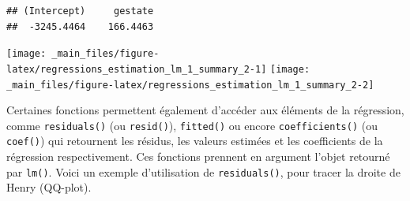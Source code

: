 \documentclass[
  11pt,
]{book}
\newenvironment{Shaded}{\begin{snugshade}}{\end{snugshade}}
\newcommand{\CommentTok}[1]{\textcolor[rgb]{0.56,0.35,0.01}{\textit{#1}}}
\newcommand{\KeywordTok}[1]{\textcolor[rgb]{0.13,0.29,0.53}{\textbf{#1}}}
\newcommand{\NormalTok}[1]{#1}
\newcommand{\OperatorTok}[1]{\textcolor[rgb]{0.81,0.36,0.00}{\textbf{#1}}}
\newcommand{\StringTok}[1]{\textcolor[rgb]{0.31,0.60,0.02}{#1}}
\numberwithin{equation}{section}
\numberwithin{countremarque}{section}
\begin{document}
\begin{lstlisting}
## (Intercept)     gestate 
##  -3245.4464    166.4463
\end{lstlisting}

\begin{Shaded}
\end{Shaded}

\begin{center}\texttt{[image: \_main\_files/figure-latex/regressions\_estimation\_lm\_1\_summary\_2-1]} \texttt{[image: \_main\_files/figure-latex/regressions\_estimation\_lm\_1\_summary\_2-2]} \end{center}

Certaines fonctions permettent également d'accéder aux éléments de la régression, comme \texttt{residuals()} (ou \texttt{resid()}), \texttt{fitted()} ou encore \texttt{coefficients()} (ou \texttt{coef()}) qui retournent les résidus, les valeurs estimées et les coefficients de la régression respectivement. Ces fonctions prennent en argument l'objet retourné par \texttt{lm()}. Voici un exemple d'utilisation de \texttt{residuals()}, pour tracer la droite de Henry (QQ-plot).
\end{document}
